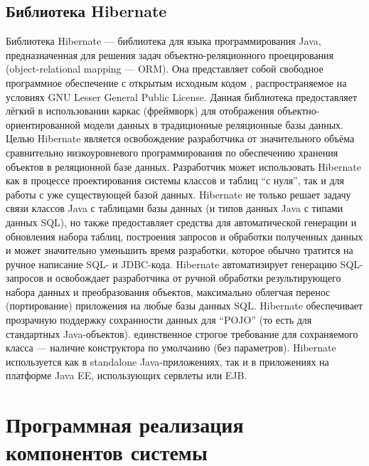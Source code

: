 \documentclass[14pt,a4paper]{reportmod}
\begin{document}
\subsection{Библиотека Hibernate}
Библиотека Hibernate — библиотека для языка программирования Java, предназначенная для решения задач объектно-реляционного проецирования (object-relational mapping — ORM). Она представляет собой свободное программное обеспечение с открытым исходным кодом , распространяемое на условиях GNU Lesser General Public License. Данная библиотека предоставляет лёгкий в использовании каркас (фреймворк) для отображения объектно-ориентированной модели данных в традиционные реляционные базы данных.
Целью Hibernate является освобождение разработчика от значительного объёма сравнительно низкоуровневого программирования по обеспечению хранения объектов в реляционной базе данных. Разработчик может использовать Hibernate как в процессе проектирования системы классов и таблиц ``с нуля'', так и для работы с уже существующей базой данных.
Hibernate не только решает задачу связи классов Java с таблицами базы данных (и типов данных Java с типами данных SQL), но также предоставляет средства для автоматической генерации и обновления набора таблиц, построения запросов и обработки полученных данных и может значительно уменьшить время разработки, которое обычно тратится на ручное написание SQL- и JDBC-кода. Hibernate автоматизирует генерацию SQL-запросов и освобождает разработчика от ручной обработки результирующего набора данных и преобразования объектов, максимально облегчая перенос (портирование) приложения на любые базы данных SQL.
Hibernate обеспечивает прозрачную поддержку сохранности данных  для ``POJO'' (то есть для стандартных Java-объектов). единственное строгое требование для сохраняемого класса — наличие конструктора по умолчанию (без параметров).
Hibernate используется как в standalone Java-приложениях, так и в приложениях на платформе Java EE, использующих сервлеты или EJB.

\section{Программная реализация компонентов системы}
\end{document}
